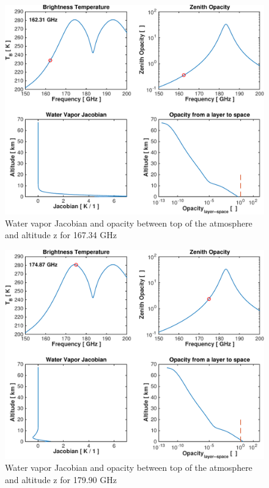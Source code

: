 \documentclass[paper=a4, fontsize=11pt]{scrartcl} %
\begin{document}
\begin{figure}[h]
\centering
	\includegraphics[width=\textwidth]{plots/jac_162GHz.pdf}
	\caption{Water vapor Jacobian and opacity between top of the atmosphere and altitude z for 167.34 GHz}
\end{figure}

\begin{figure}[h]
\centering
	\includegraphics[width=\textwidth]{plots/jac_175GHz.pdf}
	\caption{Water vapor Jacobian and opacity between top of the atmosphere and altitude z for 179.90 GHz}
\end{figure}
\end{document}
